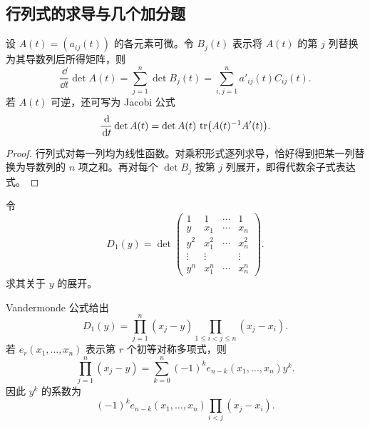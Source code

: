 \subsection{行列式的求导与几个加分题}

\begin{theorem}[行列式求导公式]
设 $A(t)=(a_{ij}(t))$ 的各元素可微。令 $B_j(t)$ 表示将 $A(t)$ 的第 $j$ 列替换为其导数列后所得矩阵，则
\begin{equation}
 \frac{\dd}{\dd t}\det A(t)
 =\sum_{j=1}^n\det B_j(t)
 =\sum_{i,j=1}^n a'_{ij}(t)C_{ij}(t).
\end{equation}
若 $A(t)$ 可逆，还可写为 Jacobi 公式
\begin{equation}
 \frac{\,\mathrm d}{\,\mathrm d t}\det A(t)
 =\det A(t)\,\operatorname{tr}\bigl(A(t)^{-1}A'(t)\bigr).
\end{equation}
\end{theorem}

\begin{proof}
行列式对每一列均为线性函数。对乘积形式逐列求导，恰好得到把某一列替换为导数列的 $n$ 项之和。再对每个 $\det B_j$ 按第 $j$ 列展开，即得代数余子式表达式。
\end{proof}

\begin{exercise}
令
\begin{equation}
 D_1(y)=
 \det\begin{pmatrix}
 1&1&\cdots&1\\
 y&x_1&\cdots&x_n\\
 y^2&x_1^2&\cdots&x_n^2\\
 \vdots&\vdots&&\vdots\\
 y^n&x_1^n&\cdots&x_n^n
 \end{pmatrix}.
\end{equation}
求其关于 $y$ 的展开。
\end{exercise}

\begin{solution}
Vandermonde 公式给出
\begin{equation}
 D_1(y)=
 \prod_{j=1}^n(x_j-y)
 \prod_{1\leq i<j\leq n}(x_j-x_i).
\end{equation}
若 $e_r(x_1,\ldots,x_n)$ 表示第 $r$ 个初等对称多项式，则
\begin{equation}
 \prod_{j=1}^n(x_j-y)
 =\sum_{k=0}^n(-1)^k e_{n-k}(x_1,\ldots,x_n)y^k.
\end{equation}
因此 $y^k$ 的系数为
\begin{equation}
 (-1)^k e_{n-k}(x_1,\ldots,x_n)
 \prod_{i<j}(x_j-x_i).
\end{equation}
\end{solution}

